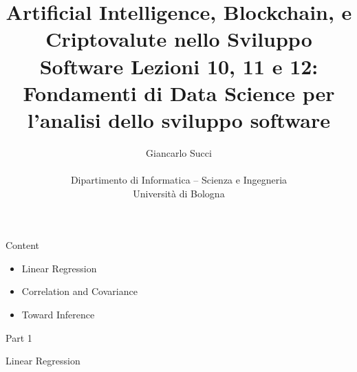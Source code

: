 \documentclass{beamer}
\title[L01]{Artificial Intelligence, Blockchain, e Criptovalute nello Sviluppo Software \newline\newline
Lezioni 10, 11 e 12: Fondamenti di Data Science per l'analisi dello sviluppo software} %
\author[{\tiny Giancarlo Succi }]{Giancarlo Succi\\\\ Dipartimento di Informatica -- Scienza e Ingegneria\\Universit\`{a} di Bologna\\
\bftt{g.succi@unibo.it}
} %
\institute[unibo] %
\date{} %
\begin{document}
\begin{frame}
\titlepage %

\end{frame}



\begin{frame}
{\centerline{Content}}

\begin{itemize}
\item Linear Regression
\item Correlation and Covariance
\item Toward Inference
\end{itemize}
\end{frame}

\begin{frame}
{\centerline{Part 1}}

\begin{center}
\Huge Linear Regression
\end{center}
\end{frame}
\end{document}
